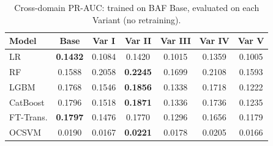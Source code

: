 \begin{table}[ht!]
\centering
\caption{Cross-domain PR-AUC: trained on BAF Base, evaluated on each Variant (no retraining).}
\label{tab:crossdomain_prauc}
\begin{tabular}{l c c c c c c}
\toprule
Model & Base & Var I & Var II & Var III & Var IV & Var V \\
\midrule
LR         & \textbf{0.1432} & 0.1084 & 0.1420 & 0.1015 & 0.1359 & 0.1005 \\
RF         & 0.1588 & 0.2058 & \textbf{0.2245} & 0.1699 & 0.2108 & 0.1593 \\
LGBM       & 0.1768 & 0.1546 & \textbf{0.1856} & 0.1338 & 0.1718 & 0.1222 \\
CatBoost   & 0.1796 & 0.1518 & \textbf{0.1871} & 0.1336 & 0.1736 & 0.1235 \\
FT-Trans.  & \textbf{0.1797} & 0.1476 & 0.1770 & 0.1296 & 0.1656 & 0.1179 \\
OCSVM      & 0.0190 & 0.0167 & \textbf{0.0221} & 0.0178 & 0.0205 & 0.0166 \\
\bottomrule
\end{tabular}
\end{table}